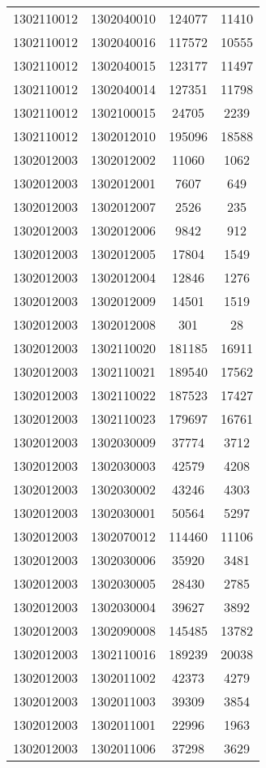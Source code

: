 \begin{longtable}{llcc}
1302110012 & 1302040010 & 124077 & 11410\\
1302110012 & 1302040016 & 117572 & 10555\\
1302110012 & 1302040015 & 123177 & 11497\\
1302110012 & 1302040014 & 127351 & 11798\\
1302110012 & 1302100015 & 24705 & 2239\\
1302110012 & 1302012010 & 195096 & 18588\\
1302012003 & 1302012002 & 11060 & 1062\\
1302012003 & 1302012001 & 7607 & 649\\
1302012003 & 1302012007 & 2526 & 235\\
1302012003 & 1302012006 & 9842 & 912\\
1302012003 & 1302012005 & 17804 & 1549\\
1302012003 & 1302012004 & 12846 & 1276\\
1302012003 & 1302012009 & 14501 & 1519\\
1302012003 & 1302012008 & 301 & 28\\
1302012003 & 1302110020 & 181185 & 16911\\
1302012003 & 1302110021 & 189540 & 17562\\
1302012003 & 1302110022 & 187523 & 17427\\
1302012003 & 1302110023 & 179697 & 16761\\
1302012003 & 1302030009 & 37774 & 3712\\
1302012003 & 1302030003 & 42579 & 4208\\
1302012003 & 1302030002 & 43246 & 4303\\
1302012003 & 1302030001 & 50564 & 5297\\
1302012003 & 1302070012 & 114460 & 11106\\
1302012003 & 1302030006 & 35920 & 3481\\
1302012003 & 1302030005 & 28430 & 2785\\
1302012003 & 1302030004 & 39627 & 3892\\
1302012003 & 1302090008 & 145485 & 13782\\
1302012003 & 1302110016 & 189239 & 20038\\
1302012003 & 1302011002 & 42373 & 4279\\
1302012003 & 1302011003 & 39309 & 3854\\
1302012003 & 1302011001 & 22996 & 1963\\
1302012003 & 1302011006 & 37298 & 3629\\

\end{longtable}
